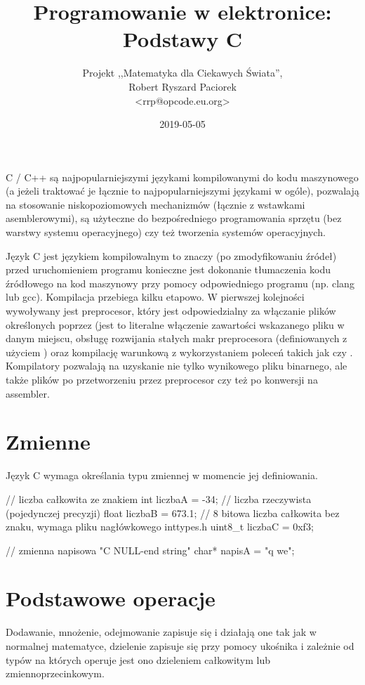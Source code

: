 \documentclass{pdfBooklets}
\title{Programowanie w elektronice: Podstawy C}
\author{%
	Projekt ,,Matematyka dla Ciekawych Świata'',\\
	Robert Ryszard Paciorek\\\normalsize\ttfamily <rrp@opcode.eu.org>
}
\date  {2019-05-05}
\begin{document}
\maketitle

C / C++ są najpopularniejszymi językami kompilowanymi do kodu maszynowego (a jeżeli traktować je łącznie to najpopularniejszymi językami w ogóle), pozwalają na stosowanie niskopoziomowych mechanizmów (łącznie z wstawkami asemblerowymi), są użyteczne do bezpośredniego programowania sprzętu (bez warstwy systemu operacyjnego) czy też tworzenia systemów operacyjnych.

Język C jest językiem kompilowalnym to znaczy (po zmodyfikowaniu źródeł) przed uruchomieniem programu konieczne jest dokonanie tłumaczenia kodu źródłowego na kod maszynowy przy pomocy odpowiedniego programu (np. clang lub gcc). Kompilacja przebiega kilku etapowo. W pierwszej kolejności wywoływany jest preprocesor, który jest odpowiedzialny za włączanie plików określonych poprzez  (jest to literalne włączenie zawartości wskazanego pliku w danym miejscu, obsługę rozwijania stałych makr preprocesora (definiowanych z użyciem ) oraz kompilację warunkową z wykorzystaniem poleceń takich jak  czy . Kompilatory pozwalają na uzyskanie nie tylko wynikowego pliku binarnego, ale także plików po przetworzeniu przez preprocesor czy też po konwersji na assembler.

\section{Zmienne}

Język C wymaga określania typu zmiennej w momencie jej definiowania.

\begin{CodeFrame*}[c]{}
// liczba całkowita ze znakiem
int     liczbaA = -34;
// liczba rzeczywista (pojedynczej precyzji)
float   liczbaB = 673.1;
// 8 bitowa liczba całkowita bez znaku, wymaga pliku nagłówkowego inttypes.h
uint8_t liczbaC = 0xf3;

// zmienna napisowa "C NULL-end string"
char* napisA = "q we";
\end{CodeFrame*}

\section{Podstawowe operacje}

Dodawanie, mnożenie, odejmowanie zapisuje się i działają one tak jak w normalnej matematyce, dzielenie zapisuje się przy pomocy ukośnika i zależnie od typów na których operuje jest ono dzieleniem całkowitym lub zmiennoprzecinkowym.
\end{document}
